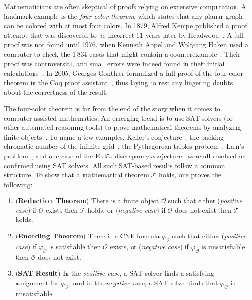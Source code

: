 Mathematicians are often skeptical of proofs relying on extensive computation.
A landmark example is the \emph{four-color theorem}, which states that any planar graph can be colored with at most four colors. 
In 1879, Alfred Kempe published a proof attempt that was discovered to be incorrect 11 years later by Headwood~\cite{Walters2004ItAT,Wilson2002GraphsCA}.
A full proof was not found until 1976, when Kenneth Appel and Wolfgang Haken used a computer to check the 1\,834 cases that might contain a counterexample~\cite{appelFourColorProblem1978}.
Their proof was controversial, and small errors were indeed found in their initial calculations~\cite{Walters2004ItAT,Wilson2002GraphsCA}.
In 2005, Georges Gonthier formalized a full proof of the four-color theorem in the \textsf{Coq} proof assistant~\cite{gonthierFourColourTheorem2008a}, thus laying to rest any lingering doubts about the correctness of the result.

The four-color theorem is far from the end of the story when it comes to computer-assisted mathematics.
An emerging trend is to use SAT solvers (or other automated reasoning tools) to prove mathematical theorems by analyzing finite objects~\cite{avigad2023mathematics}. 
To name a few examples,
Keller's conjecture~\cite{brakensiek2023resolution},
the packing chromatic number of the infinite grid~\cite{Subercaseaux_Heule_2023},
the Pythagorean triples problem~\cite{Heule_2016},
Lam's problem~\cite{21bright_sat_based_resolution_lams_problem},
and one case of the Erd\H{o}s discrepancy conjecture~\cite{konev2014sat}
were all resolved or confirmed using SAT solvers.
All such SAT-based results follow a common structure. To show that a mathematical theorem $\mathcal{T}$ holds, one proves the following:

\begin{enumerate}
  \item (\textbf{Reduction Theorem}) There is a finite object $\mathcal{O}$ such that either (\emph{positive case}) if $\mathcal{O}$ exists then $\mathcal{T}$ holds, or (\emph{negative case}) if $\mathcal{O}$ does not exist then $\mathcal{T}$ holds. %
  \item (\textbf{Encoding Theorem}) There is a CNF formula $\varphi_{\mathcal{O}}$ such that either (\emph{positive case}) if $\varphi_{\mathcal{O}}$ is satisfiable then $\mathcal{O}$ exists, or (\emph{negative case}) if $\varphi_{\mathcal{O}}$ is unsatisfiable then $\mathcal{O}$ does not exist.
  \item (\textbf{SAT Result}) In the \emph{positive case}, a SAT solver finds a satisfying assignment for $\varphi_{\mathcal{O}}$, and in the \emph{negative case}, a SAT solver finds that $\varphi_{\mathcal{O}}$ is unsatisfiable.
\end{enumerate}


